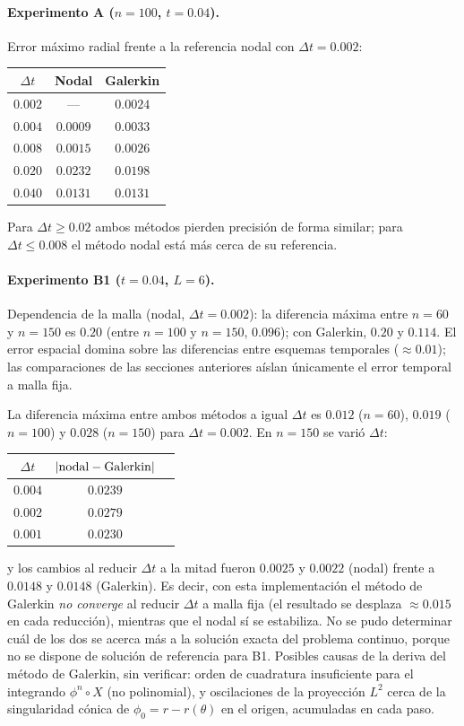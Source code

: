 \paragraph{Experimento A ($n=100$, $t=0.04$).} Error máximo radial frente a la referencia nodal con $\Delta t=0.002$:
\begin{center}
\begin{tabular}{ccc}
\toprule
$\Delta t$ & Nodal & Galerkin\\
\midrule
$0.002$ & --- & $0.0024$\\
$0.004$ & $0.0009$ & $0.0033$\\
$0.008$ & $0.0015$ & $0.0026$\\
$0.020$ & $0.0232$ & $0.0198$\\
$0.040$ & $0.0131$ & $0.0131$\\
\bottomrule
\end{tabular}
\end{center}
Para $\Delta t\ge0.02$ ambos métodos pierden precisión de forma similar; para $\Delta t\le0.008$ el método nodal está más cerca de su referencia.

\paragraph{Experimento B1 ($t=0.04$, $L=6$).} Dependencia de la malla (nodal, $\Delta t=0.002$): la diferencia máxima entre $n=60$ y $n=150$ es $0.20$ (entre $n=100$ y $n=150$, $0.096$); con Galerkin, $0.20$ y $0.114$. El error espacial domina sobre las diferencias entre esquemas temporales ($\approx0.01$); las comparaciones de las secciones anteriores aíslan únicamente el error temporal a malla fija.

La diferencia máxima entre ambos métodos a igual $\Delta t$ es $0.012$ ($n=60$), $0.019$ ($n=100$) y $0.028$ ($n=150$) para $\Delta t=0.002$. En $n=150$ se varió $\Delta t$:
\begin{center}
\begin{tabular}{ccc}
\toprule
$\Delta t$ & $|{\rm nodal}-{\rm Galerkin}|$ & \\
\midrule
$0.004$ & $0.0239$ & \\
$0.002$ & $0.0279$ & \\
$0.001$ & $0.0230$ & \\
\bottomrule
\end{tabular}
\end{center}
y los cambios al reducir $\Delta t$ a la mitad fueron $0.0025$ y $0.0022$ (nodal) frente a $0.0148$ y $0.0148$ (Galerkin). Es decir, con esta implementación el método de Galerkin \emph{no converge} al reducir $\Delta t$ a malla fija (el resultado se desplaza $\approx0.015$ en cada reducción), mientras que el nodal sí se estabiliza. No se pudo determinar cuál de los dos se acerca más a la solución exacta del problema continuo, porque no se dispone de solución de referencia para B1. Posibles causas de la deriva del método de Galerkin, sin verificar: orden de cuadratura insuficiente para el integrando $\phi^n\circ X$ (no polinomial), y oscilaciones de la proyección $L^2$ cerca de la singularidad cónica de $\phi_0=r-r(\theta)$ en el origen, acumuladas en cada paso.

